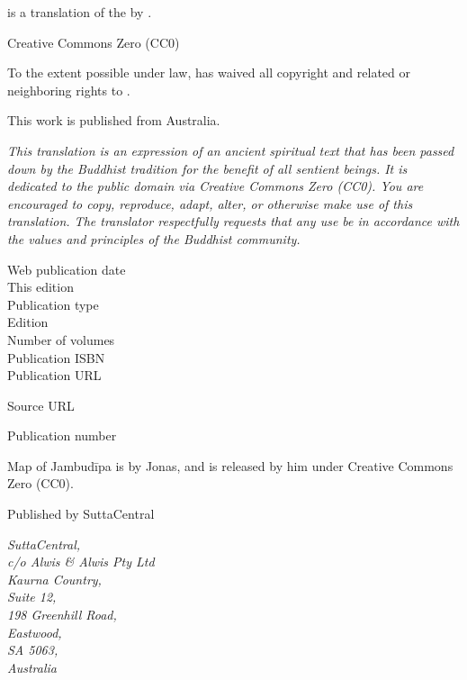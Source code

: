 
\begin{footnotesize}

\textit{} is a translation of the  by .

\medskip

Creative Commons Zero (CC0)

To the extent possible under law,  has waived all copyright and related or neighboring rights to \textit{}.

\medskip

This work is published from Australia.

\begin{center}
\textit{This translation is an expression of an ancient spiritual text that has been passed down by the Buddhist tradition for the benefit of all sentient beings. It is dedicated to the public domain via Creative Commons Zero (CC0). You are encouraged to copy, reproduce, adapt, alter, or otherwise make use of this translation. The translator respectfully requests that any use be in accordance with the values and principles of the Buddhist community.}
\end{center}

\medskip

\begin{description}
    \item[Web publication date] 
    \item[This edition] 
    \item[Publication type] 
    \item[Edition] 
    \item[Number of volumes] 
    \item[Publication ISBN] 
    \item[Publication URL] \href{\VAR{publication_url | safe}}{}
    \item[Source URL] \href{\VAR{source_url | safe}}{}
    \item[Publication number] 
\end{description}

\medskip

Map of Jambudīpa is by Jonas, and is released by him under Creative Commons Zero (CC0).

\medskip

Published by SuttaCentral

\medskip

\textit{SuttaCentral,\\
c/o Alwis \& Alwis Pty Ltd\\
Kaurna Country,\\
Suite 12,\\
198 Greenhill Road,\\
Eastwood,\\
SA 5063,\\
Australia}

\end{footnotesize}

\newpage

\setlength{\parindent}{1.5em}%
